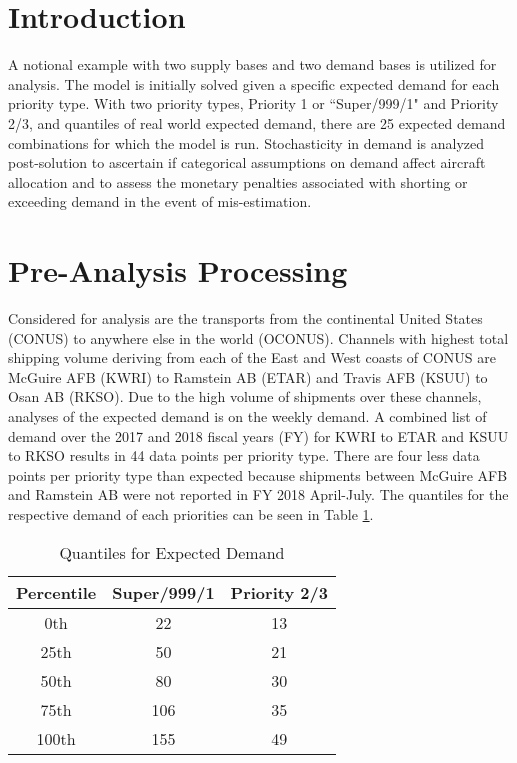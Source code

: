 \section{Introduction}
A notional example with two supply bases and two demand bases is utilized for analysis. The model is initially solved given a specific expected demand for each priority type. With two priority types, Priority 1 or ``Super/999/1" and Priority 2/3, and quantiles of real world expected demand, there are 25 expected demand combinations for which the model is run. Stochasticity in demand is analyzed post-solution to ascertain if categorical assumptions on demand affect aircraft allocation and to assess the monetary penalties associated with shorting or exceeding demand in the event of mis-estimation.

\section{Pre-Analysis Processing}
Considered for analysis are the transports from the continental United States (CONUS) to anywhere else in the world (OCONUS). Channels with highest total shipping volume deriving from each of the East and West coasts of CONUS are McGuire AFB (KWRI) to Ramstein AB (ETAR) and Travis AFB (KSUU) to Osan AB (RKSO). Due to the high volume of shipments over these channels, analyses of the expected demand is on the weekly demand. A combined list of demand over the 2017 and 2018 fiscal years (FY) for KWRI to ETAR and KSUU to RKSO results in 44 data points per priority type. There are four less data points per priority type than expected because shipments between McGuire AFB and Ramstein AB were not reported in FY 2018 April-July. The quantiles for the respective demand of each priorities can be seen in Table \ref{table_quantiles}.
\begin{table}[H]
    \centering
    \caption{Quantiles for Expected Demand}
    \begin{tabular}{@{}ccc@{}}
    \toprule
    Percentile & Super/999/1 & Priority 2/3 \\ \midrule   
    0th & 22  & 13   \\
    25th & 50  & 21\\
    50th & 80  & 30 \\
    75th & 106 &35\\
    100th & 155 &49\\ \bottomrule
    \end{tabular}
    \label{table_quantiles}
\end{table}


